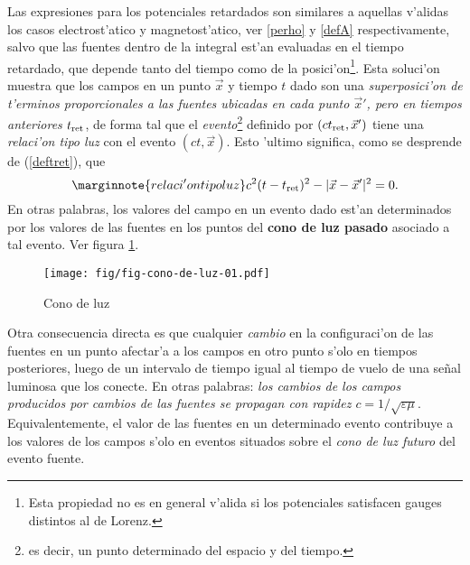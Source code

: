 Las expresiones para los potenciales retardados son similares a aquellas v'alidas los casos electrost'atico y magnetost'atico, ver \eqref{perho} y \eqref{defA} respectivamente, salvo que las fuentes dentro de la integral est'an evaluadas en el tiempo retardado, que depende tanto del tiempo como de la posici'on\footnote{Esta propiedad no es en general v'alida si los potenciales satisfacen gauges distintos al de Lorenz.}. Esta soluci'on muestra que los campos en un punto $\vec{x}$ y tiempo $t$ dado son una  \textit{superposici'on de t'erminos proporcionales a las fuentes ubicadas en \textit{cada punto} $\vec{x}'$, pero en tiempos anteriores} $t_{\rm ret}$, de forma tal que el \textit{evento}\footnote{es decir, un punto determinado del espacio y del tiempo.} definido por $(ct_{\rm ret},\vec{x}')$ tiene una \textit{relaci'on tipo luz} con el evento $(ct,\vec{x})$. Esto 'ultimo significa, como se desprende de (\ref{deftret}), que
\begin{equation}\marginnote{relaci'on tipo luz}
 c^2(t-t_{\rm ret})^2-|\vec{x}-\vec{x}'|^2=0.
\end{equation}
En otras palabras, los valores del campo en un evento dado est'an determinados por los valores de las fuentes en los puntos del \textbf{cono de luz pasado} asociado a tal evento. Ver figura \ref{fig:cdl2}.
\begin{figure}[!h]
\centerline{\texttt{[image: fig/fig-cono-de-luz-01.pdf]}}
\caption{Cono de luz}
\label{fig:cdl2}
\end{figure}

Otra consecuencia directa es que cualquier \textit{cambio} en la configuraci'on de las fuentes en un punto afectar'a a los campos en otro punto s'olo en tiempos posteriores, luego de un intervalo de tiempo igual al tiempo de vuelo de una señal luminosa que los conecte. En otras palabras: \textit{los cambios de los campos producidos por cambios de las fuentes se propagan con rapidez $c=1/\sqrt{\varepsilon\mu}$}. Equivalentemente, el valor de las fuentes en un determinado evento contribuye a los valores de los campos s'olo en eventos situados sobre el \textit{cono de luz futuro} del evento fuente.

